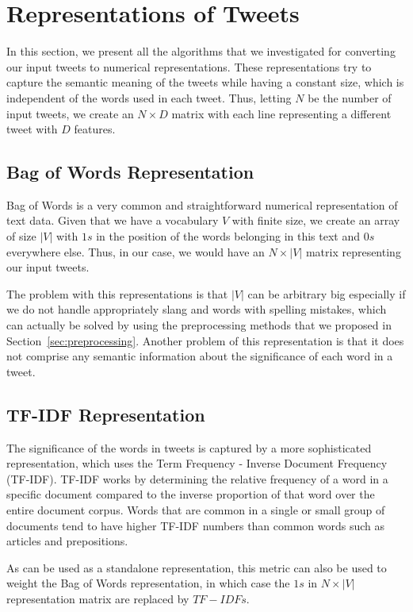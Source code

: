 \section{Representations of Tweets}
\label{sec:tweetRepresentations}

In this section, we present all the algorithms that we investigated for converting our input tweets to numerical representations.
These representations try to capture the semantic meaning of the tweets 
while having a constant size, which is independent of the words used in each tweet.
Thus, letting $N$ be the number of input tweets, we create an $N \times D$ matrix
with each line representing a different tweet with $D$ features.


\subsection{Bag of Words Representation}
Bag of Words \cite{harris1954distributional} is a very common and straightforward numerical representation of text data.
Given that we have a vocabulary $V$ with finite size, we create
an array of size $|V|$ with $1s$ in the position of the words belonging in this text and $0s$ everywhere else.
Thus, in our case, we would have an $N \times |V|$ matrix representing our input tweets.

The problem with this representations is that $|V|$ can be arbitrary big especially if we do not handle appropriately slang and words with spelling mistakes, which can actually be solved by using the preprocessing methods that we proposed in Section~\ref{sec:preprocessing}. 
Another problem of this representation is that it does not comprise any semantic information about the significance of each word in a tweet. 


\subsection{TF-IDF Representation}
The significance of the words in tweets is captured by a more sophisticated representation, which uses the Term Frequency - Inverse Document Frequency (TF-IDF).
TF-IDF \cite{sparck1972statistical} works by determining the relative frequency of a word in a specific document compared to the inverse proportion of that word over the entire document corpus.
Words that are common in a single or small group of documents tend to have higher TF-IDF numbers than common words such as articles and prepositions. 

As can be used as a standalone representation, this metric can also be used to weight the Bag of Words representation, in which case the $1s$ in $N \times |V|$  representation matrix are replaced by $TF-IDFs$.


